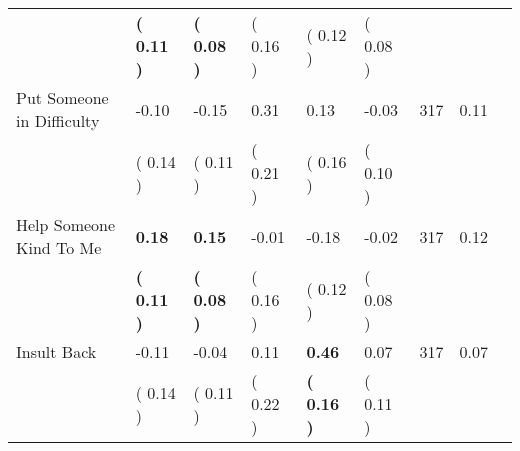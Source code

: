 \begin{tabular}{L{6.2cm} C{1.8cm} C{1.8cm} C{1.8cm} C{1.8cm} C{1.8cm} C{1.8cm} C{0.3cm} C{0.3cm}}
 & \textbf{(     0.11 )} & \textbf{(     0.08 )} & (     0.16 ) & (     0.12 ) & (     0.08 )  & \\
Put Someone in Difficulty &     -0.10 &     -0.15 &      0.31 &      0.13 &     -0.03  & 317 &       0.11 \\ 
 & (     0.14 ) & (     0.11 ) & (     0.21 ) & (     0.16 ) & (     0.10 )  & \\
Help Someone Kind To Me & \textbf{     0.18} & \textbf{     0.15} &     -0.01 &     -0.18 &     -0.02  & 317 &       0.12 \\ 
 & \textbf{(     0.11 )} & \textbf{(     0.08 )} & (     0.16 ) & (     0.12 ) & (     0.08 )  & \\
Insult Back &     -0.11 &     -0.04 &      0.11 & \textbf{     0.46} &      0.07  & 317 &       0.07 \\ 
 & (     0.14 ) & (     0.11 ) & (     0.22 ) & \textbf{(     0.16 )} & (     0.11 )  & \\
\bottomrule
\end{tabular}
